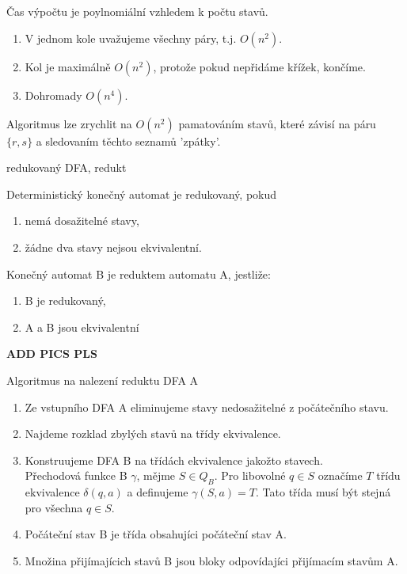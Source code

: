 \documentclass[../main.tex]{subfiles}
\begin{document}
Čas výpočtu je poylnomiální vzhledem k počtu stavů.

\begin{enumerate}
    \item V jednom kole uvažujeme všechny páry, t.j. $O(n^2)$.
    \item Kol je maximálně $O(n^2)$, protože pokud nepřidáme křížek, končíme.
    \item Dohromady $O(n^4)$.
\end{enumerate}
Algoritmus lze zrychlit na $O(n^2)$ pamatováním stavů, které závisí na páru $\{r,s\}$ a sledovaním těchto seznamů 'zpátky'.

\begin{definition}
    redukovaný DFA, redukt

    Deterministický konečný automat je redukovaný, pokud
    \begin{enumerate}
        \item nemá dosažitelné stavy,
        \item žádne dva stavy nejsou ekvivalentní.
    \end{enumerate}
    Konečný automat B je reduktem automatu A, jestliže:
    \begin{enumerate}
        \item B je redukovaný,
        \item A a B jsou ekvivalentní
    \end{enumerate}
    \textbf{ADD PICS PLS}
\end{definition}
\begin{theorem}
    Algoritmus na nalezení reduktu DFA A

    \begin{enumerate}
        \item Ze vstupního DFA A eliminujeme stavy nedosažitelné z počátečního stavu.
        \item Najdeme rozklad zbylých stavů na třídy ekvivalence.
        \item Konstruujeme DFA B na třídách ekvivalence jakožto stavech.\\
        Přechodová funkce B $\gamma$, mějme $S\in Q_B$. Pro libovolné $q\in S$ označíme $T$ třídu ekvivalence
        $\delta(q,a)$ a definujeme $\gamma(S,a) = T.$ Tato třída musí být stejná pro všechna $q\in S$.
        \item Počáteční stav B je třída obsahujíci počáteční stav A.
        \item Množina přijímajícich stavů B jsou bloky odpovídajíci přijímacím stavům A.
    \end{enumerate}
\end{theorem}
\end{document}
